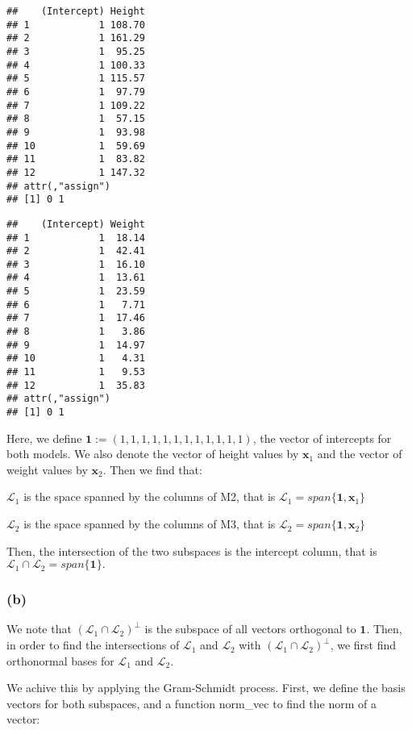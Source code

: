 \documentclass[]{article}
\begin{document}
\begin{verbatim}
##    (Intercept) Height
## 1            1 108.70
## 2            1 161.29
## 3            1  95.25
## 4            1 100.33
## 5            1 115.57
## 6            1  97.79
## 7            1 109.22
## 8            1  57.15
## 9            1  93.98
## 10           1  59.69
## 11           1  83.82
## 12           1 147.32
## attr(,"assign")
## [1] 0 1
\end{verbatim}

\begin{verbatim}
##    (Intercept) Weight
## 1            1  18.14
## 2            1  42.41
## 3            1  16.10
## 4            1  13.61
## 5            1  23.59
## 6            1   7.71
## 7            1  17.46
## 8            1   3.86
## 9            1  14.97
## 10           1   4.31
## 11           1   9.53
## 12           1  35.83
## attr(,"assign")
## [1] 0 1
\end{verbatim}

Here, we define \(\mathbf{1} := (1,1,1,1,1,1,1,1,1,1,1,1)\), the vector
of intercepts for both models. We also denote the vector of height
values by \(\mathbf{x}_1\) and the vector of weight values by
\(\mathbf{x}_2\). Then we find that:

\(\mathcal{L}_1\) is the space spanned by the columns of M2, that is
\(\mathcal{L}_1 = span \{ \mathbf{1}, \mathbf{x}_1 \}\)

\(\mathcal{L}_2\) is the space spanned by the columns of M3, that is
\(\mathcal{L}_2 = span \{ \mathbf{1}, \mathbf{x}_2 \}\)

Then, the intersection of the two subspaces is the intercept column,
that is \(\mathcal{L}_1 \cap \mathcal{L}_2 = span { \{\mathbf{1} \} }.\)

\subsubsection{(b)}\label{b}

We note that \((\mathcal{L}_1 \cap \mathcal{L}_2)^{\perp}\) is the
subspace of all vectors orthogonal to \(\mathbf{1}\). Then, in order to
find the intersections of \(\mathcal{L}_1\) and \(\mathcal{L}_2\) with
\((\mathcal{L}_1 \cap \mathcal{L}_2)^{\perp}\), we first find
orthonormal bases for \(\mathcal{L}_1\) and \(\mathcal{L}_2\).

We achive this by applying the Gram-Schmidt process. First, we define
the basis vectors for both subspaces, and a function norm\_vec to find
the norm of a vector:
\end{document}
